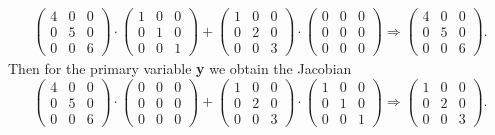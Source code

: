 \begin{align*}
    \begin{pmatrix}
        4&0&0\\
        0&5&0\\
        0&0&6\end{pmatrix}
        \cdot
        \begin{pmatrix}
        1&0&0\\
        0&1&0\\
        0&0&1
        \end{pmatrix}
        +
        \begin{pmatrix}
        1&0&0\\
        0&2&0\\
        0&0&3
        \end{pmatrix}
        \cdot
        \begin{pmatrix}
        0&0&0\\
        0&0&0\\
        0&0&0
        \end{pmatrix}
        \Longrightarrow
        \begin{pmatrix}
        4&0&0\\
        0&5&0\\
        0&0&6
        \end{pmatrix}.
\end{align*}
Then for the primary variable \textbf{y} we obtain the Jacobian
\begin{equation}
    \label{eq:JacobianCalculationY}
    \begin{pmatrix}
        4&0&0\\
        0&5&0\\
        0&0&6\end{pmatrix}
        \cdot
        \begin{pmatrix}
        0&0&0\\
        0&0&0\\
        0&0&0
        \end{pmatrix}
        +
        \begin{pmatrix}
        1&0&0\\
        0&2&0\\
        0&0&3
        \end{pmatrix}
        \cdot
        \begin{pmatrix}
        1&0&0\\
        0&1&0\\
        0&0&1
        \end{pmatrix}
        \Longrightarrow
        \begin{pmatrix}
        1&0&0\\
        0&2&0\\
        0&0&3
        \end{pmatrix}.
\end{equation}
